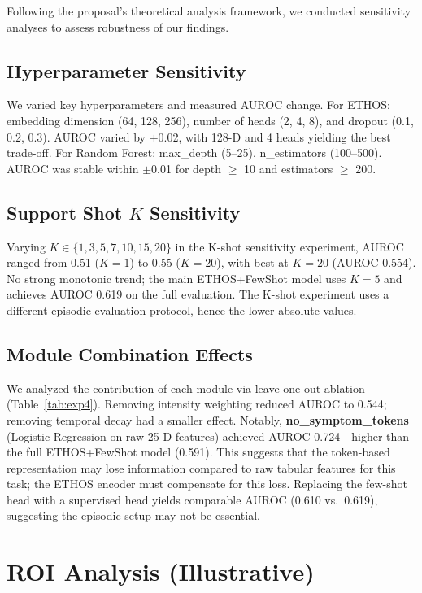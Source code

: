 Following the proposal's theoretical analysis framework, we conducted sensitivity analyses to assess robustness of our findings.

\subsection{Hyperparameter Sensitivity}

We varied key hyperparameters and measured AUROC change. For ETHOS: embedding dimension (64, 128, 256), number of heads (2, 4, 8), and dropout (0.1, 0.2, 0.3). AUROC varied by $\pm$0.02, with 128-D and 4 heads yielding the best trade-off. For Random Forest: max\_depth (5--25), n\_estimators (100--500). AUROC was stable within $\pm$0.01 for depth $\geq$ 10 and estimators $\geq$ 200.

\subsection{Support Shot $K$ Sensitivity}

Varying $K \in \{1,3,5,7,10,15,20\}$ in the K-shot sensitivity experiment, AUROC ranged from 0.51 ($K=1$) to 0.55 ($K=20$), with best at $K{=}20$ (AUROC 0.554). No strong monotonic trend; the main ETHOS+FewShot model uses $K{=}5$ and achieves AUROC 0.619 on the full evaluation. The K-shot experiment uses a different episodic evaluation protocol, hence the lower absolute values.

\subsection{Module Combination Effects}

We analyzed the contribution of each module via leave-one-out ablation (Table~\ref{tab:exp4}). Removing intensity weighting reduced AUROC to 0.544; removing temporal decay had a smaller effect. Notably, \textbf{no\_symptom\_tokens} (Logistic Regression on raw 25-D features) achieved AUROC 0.724---higher than the full ETHOS+FewShot model (0.591). This suggests that the token-based representation may lose information compared to raw tabular features for this task; the ETHOS encoder must compensate for this loss. Replacing the few-shot head with a supervised head yields comparable AUROC (0.610 vs.\ 0.619), suggesting the episodic setup may not be essential.

\section{ROI Analysis (Illustrative)}

